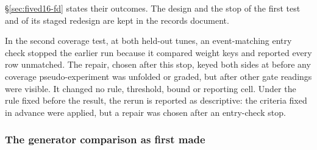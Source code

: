 \S\ref{sec:fived16-fd} states their outcomes. The design and the stop of the first test and of its staged redesign are kept in the records document.

In the second coverage test, at both held-out tunes, an event-matching entry check stopped the earlier run because it compared  weight keys and reported every row unmatched. The repair, chosen after this stop, keyed both sides at  before any coverage pseudo-experiment was unfolded or graded, but after other gate readings were visible. It changed no rule, threshold, bound or reporting cell. Under the rule fixed before the result, the rerun is reported as descriptive: the criteria fixed in advance were applied, but a repair was chosen after an entry-check stop.

\subsubsection{The generator comparison as first made}
\label{app:devhistory-fived16-stageg}

